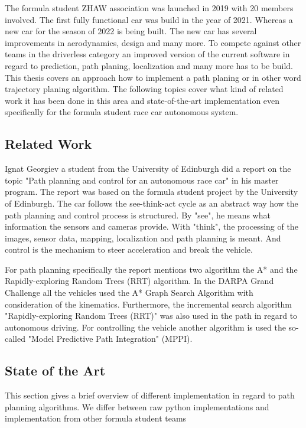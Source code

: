 The formula student ZHAW association was launched in 2019 with 20 members involved. The first fully functional car was build in the year of 2021. Whereas a new car for the season of 2022 is being built. The new car has several improvements in aerodynamics, design and many more. \cite{fszhaw_launch}
To compete against other teams in the driverless category an improved version of the current software in regard to prediction, path planing, localization and many more has to be build. This thesis covers an approach how to implement a path planing or in other word trajectory planing algorithm.
The following topics cover what kind of related work it has been done in this area and state-of-the-art implementation even specifically for the formula student race car autonomous system.

\subsection{Related Work}

Ignat Georgiev a student from the University of Edinburgh did a report on the topic "Path planning and control for an autonomous race car" in his master program. The report was based on the formula student project by the University of Edinburgh. The car follows the see-think-act cycle as an abstract way how the path planning and control process is structured. By "see", he means what information the sensors and cameras provide. With "think", the processing of the images, sensor data, mapping, localization and path planning is meant. And control is the mechanism to steer acceleration and break the vehicle.

For path planning specifically the report mentions two algorithm the A* and the Rapidly-exploring Random Trees (RRT) algorithm. In the DARPA Grand Challenge all the vehicles used the A* Graph Search Algorithm with consideration of the kinematics. Furthermore, the incremental search algorithm "Rapidly-exploring Random Trees (RRT)" was also used in the path in regard to autonomous driving.
For controlling the vehicle another algorithm is used the so-called "Model Predictive Path Integration" (MPPI).
\cite{path_planning_and_control_georgiev}

\subsection{State of the Art}
This section gives a brief overview of different implementation in regard to path planning algorithms. We differ between raw python implementations and implementation from other formula student teams

